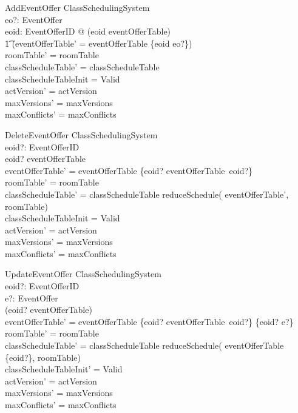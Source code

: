 \documentclass[a4paper]{article}
\begin{document}
\begin{schema}{AddEventOffer}
  \Delta ClassSchedulingSystem \\
  eo?: EventOffer \\
  \where 
  \exists eoid: EventOfferID @ (eoid \notin \dom eventOfferTable) \land \\
  \t1 (eventOfferTable' = eventOfferTable \cup \{eoid \mapsto eo?\}) \\ 
  roomTable' = roomTable \\
  classScheduleTable' = classScheduleTable \\
  classScheduleTableInit = Valid \\
  actVersion' =  actVersion \\
  maxVersions' = maxVersions \\
  maxConflicts' = maxConflicts \\
\end{schema}
\begin{schema}{DeleteEventOffer}
  \Delta ClassSchedulingSystem \\
  eoid?: EventOfferID \\
  \where
  eoid? \in \dom eventOfferTable \\
  eventOfferTable' = eventOfferTable \setminus \{eoid? \mapsto
  eventOfferTable~eoid?\} \\
  roomTable' = roomTable \\
  classScheduleTable' = classScheduleTable \comp reduceSchedule(\dom
  eventOfferTable', \dom roomTable) \\
  classScheduleTableInit = Valid \\
  actVersion' =  actVersion \\
  maxVersions' = maxVersions \\
  maxConflicts' = maxConflicts \\
\end{schema}
\begin{schema}{UpdateEventOffer}
  \Delta ClassSchedulingSystem \\
  eoid?: EventOfferID \\
  e?: EventOffer \\
  \where
  (eoid? \in \dom eventOfferTable) \\
  eventOfferTable' = eventOfferTable \setminus \{eoid? \mapsto
  eventOfferTable~eoid?\} \cup \{eoid? \mapsto e?\} \\
  roomTable' = roomTable \\
  classScheduleTable' = classScheduleTable \comp reduceSchedule(\dom
  eventOfferTable \setminus \{eoid?\}, \dom roomTable) \\
  classScheduleTableInit' = Valid \\
  actVersion' =  actVersion \\
  maxVersions' = maxVersions \\
  maxConflicts' = maxConflicts \\
\end{schema}
\end{document}
